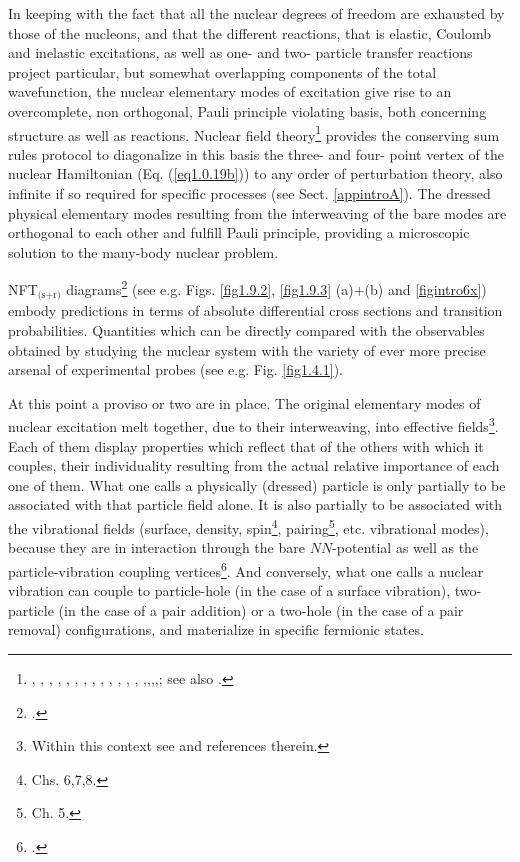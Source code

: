 In keeping with the fact that all the nuclear degrees of freedom are exhausted by those of the nucleons, and that the different reactions, that is elastic, Coulomb and inelastic excitations, as well as  one- and two- particle transfer reactions project particular, but somewhat
 overlapping  components of the total wavefunction, the nuclear elementary modes of excitation give  rise to an overcomplete, non orthogonal, Pauli principle violating basis, both concerning structure as well as reactions.  Nuclear field theory\footnote{\cite{Bes:74}, \cite{Bes:76a}, \cite{Bes:76b}, \cite{Bes:76c}, \cite{Bes:75}, \cite{Broglia:76}, \cite{Bes:75b}, \cite{Bohr:75}, \cite{Mottelson:76}, \cite{Bes:77}, \cite{Bortignon:77},  \cite{Bortignon:78}, \cite{Bes:78b}, \cite{Broglia:04a},\cite{Reinhardt:75},\cite{Reinhardt:78a},\cite{Reinhardt:78b},\cite{Reinhardt:80}; see also \cite{Bohr:19}.} provides the conserving sum rules protocol to diagonalize in this basis the three- and four- point vertex  of the nuclear Hamiltonian (Eq. (\ref{eq1.0.19b}))  to any order of perturbation theory, also infinite if so required for specific processes (see Sect. \ref{appintroA}). The dressed physical elementary modes resulting from the interweaving of the bare modes are orthogonal to each other and fulfill Pauli principle, providing a microscopic solution to the many-body nuclear problem.
 
  
 NFT$_{\text{(s+r)}}$ diagrams\footnote{\cite{Broglia:75,Broglia:04a,Broglia:16}.} (see e.g. Figs. \ref{fig1.9.2}, \ref{fig1.9.3} (a)+(b) and  \ref{figintro6x}) embody predictions  in terms of absolute differential cross sections and transition probabilities. Quantities which can be directly compared with the observables obtained by studying the nuclear system with  the variety of ever more precise arsenal of experimental probes (see e.g. Fig. \ref{fig1.4.1}). 

At this point a proviso or two are in place. The original elementary modes of nuclear excitation melt together, due to their interweaving, into effective fields\footnote{Within this context see \cite{Dickhoff:05} and references therein.}. Each of them display properties which reflect that of  the others with which it couples, their individuality resulting from the actual relative importance of each one of them. What one calls a physically  (dressed) particle is only partially to be associated with that particle field alone. It is also partially to be associated with the  vibrational fields
 (surface, density, spin\footnote{\cite{Bertsch:05} Chs. 6,7,8.}, pairing\footnote{\cite{Brink:05} Ch. 5.}, etc. vibrational modes), 
 because they are in interaction through the bare $NN$-potential as well as the particle-vibration coupling vertices\footnote{\cite{Bohr:75}.}. And conversely, what one calls a nuclear vibration can couple to  particle-hole (in the case of a surface vibration),  two-particle (in the case of a pair addition) or a two-hole (in the case of a pair removal)  configurations, and materialize in specific fermionic states. 
 
